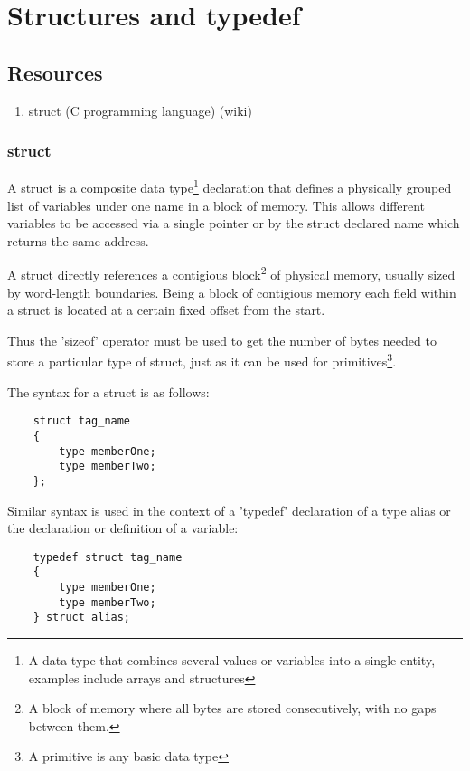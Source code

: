 \documentclass[
	12pt, %
]{fphw}
\begin{document}
\clearpage

\section{Structures and typedef}

\subsection{Resources}
\begin{problem}
	\begin{enumerate}
		\item struct (C programming language) (wiki)
	\end{enumerate}
\end{problem}

\subsubsection{struct}
\par A struct is a composite data type\footnote{A data type that combines 
several values or variables into a single entity, examples include arrays and 
structures} declaration that defines a physically grouped
list of variables under one name in a block of memory. This allows different 
variables to be accessed via a single pointer or by the struct declared name 
which returns the same address.\\

\par A struct directly references a contigious block\footnote{A block of 
memory where all bytes are stored consecutively, with no gaps between them.} of physical memory, usually
sized by word-length boundaries. Being a block of contigious memory each field
within a struct is located at a certain fixed offset from the start.\\

\par Thus the 'sizeof' operator must be used to get the number of bytes needed to
store a particular type of struct, just as it can be used for primitives\footnote{A primitive is any basic data type}.\\

\par The syntax for a struct is as follows:\\
\begin{lstlisting}
	struct tag_name
	{
		type memberOne;
		type memberTwo;
	};
\end{lstlisting}
Similar syntax is used in the context of a 'typedef' declaration of a type alias
or the declaration or definition of a variable:\\
\begin{lstlisting}
	typedef struct tag_name
	{
		type memberOne;
		type memberTwo;
	} struct_alias;
\end{lstlisting}
\end{document}

